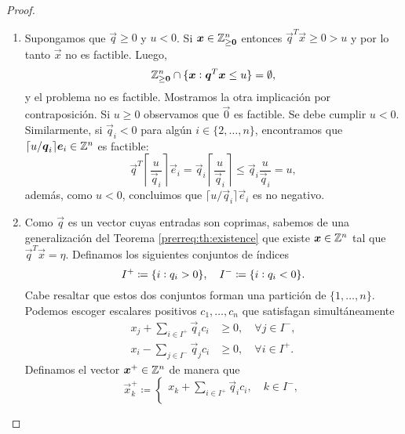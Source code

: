 \begin{proof} \hfill
	\begin{enumerate}
		\item Supongamos que $\vec{q} \geq 0$ y $u < 0$. Si $\boldsymbol{x} \in \mathbb{Z}_{\geq \boldsymbol{0}}^n$
			entonces $\vec{q}^T\vec{x} \geq 0 > u$ y por lo tanto $\vec{x}$ no es factible. Luego,
			\begin{equation*}
				\mathbb{Z}_{\geq \boldsymbol{0}}^{n} \cap \lbrace \boldsymbol{x} \vcentcolon \boldsymbol{q}^T\boldsymbol{x} 
				\leq u \rbrace = \emptyset,
			\end{equation*}
			y el problema no es factible. Mostramos la otra implicación por contraposición. Si $u
			\geq 0$ observamos que $\vec{0}$ es factible. Se debe cumplir $u < 0$. Similarmente, si
			$\vec{q}_i < 0$ para algún $i \in \lbrace 2, \ldots, n \rbrace$, encontramos que $\lceil
			u/\boldsymbol{q}_i \rceil\boldsymbol{e}_i \in \mathbb{Z}^n$ es factible:
			\begin{equation*}
				\vec{q}^T\left\lceil \frac{u}{\vec{q}_i} \right\rceil\vec{e}_i
				= \vec{q}_i \left\lceil \frac{u}{\vec{q}_i} \right\rceil
				\leq \vec{q}_i \frac{u}{\vec{q}_i} = u,
			\end{equation*}
			además, como $u < 0$, concluimos que $\lceil u/\vec{q}_i \rceil\vec{e}_i$ es no negativo.
		\item Como $\vec{q}$ es un vector cuyas entradas son coprimas, sabemos de una generalización
			del Teorema \ref{prerreq:th:existence} que existe $\boldsymbol{x} \in \mathbb{Z}^n$ tal que
			$\vec{q}^T\vec{x} = \eta$. Definamos los siguientes conjuntos de índices
			\begin{equation*}
				I^+ \coloneq \lbrace i \vcentcolon q_i > 0 \rbrace,
				\quad I^- \coloneq \lbrace i \vcentcolon q_i < 0 \rbrace.
			\end{equation*}
			Cabe resaltar que estos dos conjuntos forman una partición de $\lbrace 1, \ldots,
			n\rbrace$. Podemos escoger escalares positivos $c_1, \ldots, c_n$ que satisfagan
			simultáneamente
			\begin{align}
				x_j + \sum_{i \in I^+}\vec{q}_ic_i &\geq 0, \quad \forall j \in I^-,
				\label{theory:pf:1} \\
				x_i - \sum_{j \in I^-}\vec{q}_jc_i &\geq 0, \quad \forall i \in I^+.
				\label{theory:pf:2}
			\end{align}
			Definamos el vector $\boldsymbol{x}^+ \in \mathbb{Z}^n$ de manera que
			\begin{equation*}
				\vec{x}^+_k \coloneq \begin{cases}
					x_k + \sum_{i \in I^+}\vec{q}_ic_i, \quad k \in I^-, \\

\end{cases}
\end{equation*}
\end{enumerate}
\end{proof}
